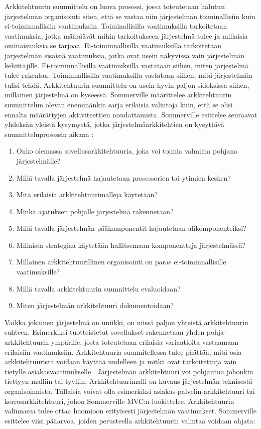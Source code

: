 \documentclass[utf8]{gradu3}
\begin{document}
Arkkitehtuurin suunnittelu on luova prosessi, jossa toteutetaan halutun järjestelmän organisointi siten, että se vastaa niin järjestelmän toiminallisiin kuin ei-toiminnallisiin vaatimuksiin. Toiminallisilla vaatimuksilla tarkoitetaan vaatimuksia, jotka määräävät mihin tarkoitukseen järjestelmä tulee ja millaisia ominaisuuksia se tarjoaa. Ei-toiminnallisilla vaatimuksilla tarkoitetaan järjestelmän sisäisiä vaatimuksia, jotka ovat usein näkyvissä vain järjestelmän kehittäjille. Ei-toiminnallisilla vaatimuksilla vastataan siihen, miten järjestelmä tulee rakentaa. Toiminnallisilla vaatimuksilla vastataan siihen, mitä järjestelmän tulisi tehdä. Arkkitehtuurin suunnittelu on usein hyvin paljon sidoksissa siihen, millainen järjestelmä on kyseessä. Sommerville määrittelee arkkitehtuurin suunnittelun olevan enemmänkin sarja erilaisia valintoja kuin, että se olisi ennalta määrättyjen aktiviteettien noudattamista. Sommerville esittelee seuraavat yhdeksän yleistä kysymystä, jotka järjestelmäarkkitehtien on kysyttävä suunnitteluprosessin aikana \parencite[s. 151]{Sommerville}:

\begin{enumerate} 
\item Onko olemassa sovellusarkkitehtuuria, joka voi toimia valmiina pohjana järjestelmälle?
\item Millä tavalla järjestelmä hajautetaan prosessorien tai ytimien kesken?
\item Mitä erilaisia arkkitehtuurimalleja käytetään?
\item Minkä ajatuksen pohjalle järjestelmä rakennetaan?
\item Millä tavalla järjestelmän pääkomponentit hajautetaan alikomponenteiksi?
\item Millaista strategiaa käytetään hallitsemaan komponentteja järjestelmässä?
\item Millainen arkkitehtuurillinen organisointi on paras ei-toiminnallisille vaatimuksille?
\item Millä tavalla arkkitehtuurin suunnittelu evaluoidaan?
\item Miten järjestelmän arkkitehtuuri dokumentoidaan?
\end{enumerate}

Vaikka jokainen järjestelmä on uniikki, on niissä paljon yhteistä arkkitehtuurin suhteen. Esimerkiksi tuotteistetut sovellukset rakennetaan yhden pohja-arkkitehtuurin ympärille, josta toteutetaan erilaisia variaatioita vastaamaan erilaisiin vaatimuksiin. Arkkitehtuuria suunnitellessa tulee päättää, mitä osia arkkitehtuurista voidaan käyttää uudelleen ja mitkä ovat tarkoitettuja vain tietylle asiakasvaatimukselle \parencite[s. 151]{Sommerville}. Järjestelmän arkkitehtuuri voi pohjautua johonkin tiettyyn malliin tai tyyliin. Arkkitehtuurimalli on kuvaus järjestelmän teknisestä organisoinnista. Tällaisia voivat olla esimerkiksi asiakas-palvelin-arkkitehtuuri tai kerrosarkkitehtuuri, johon Sommerville MVC:n luokittelee. Arkkitehtuurin valinnassa tulee ottaa huomioon erityisesti järjestelmän vaatimukset. Sommerville \parencite[s.152]{Sommerville} esittelee viisi pääarvoa, joiden perusteella arkkitehtuurin valintaa voidaan ohjata:
\end{document}
